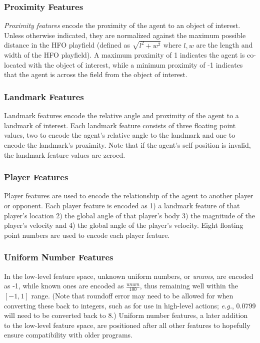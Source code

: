 \documentclass[12pt]{article}
\begin{document}
\subsubsection{Proximity Features}
\textit{Proximity features} encode the proximity of the agent to an
object of interest. Unless otherwise indicated, they are normalized
against the maximum possible distance in the HFO playfield (defined as
$\sqrt{l^2 + w^2}$ where $l,w$ are the length and width of the HFO
playfield). A maximum proximity of 1 indicates the agent is co-located
with the object of interest, while a minimum proximity of -1 indicates
that the agent is across the field from the object of interest.

\subsubsection{Landmark Features}
Landmark features encode the relative angle and proximity of the agent
to a landmark of interest. Each landmark feature consists of three
floating point values, two to encode the agent's relative angle to the
landmark and one to encode the landmark's proximity. Note that if the
agent's self position is invalid, the landmark feature values are
zeroed.

\subsubsection{Player Features}
Player features are used to encode the relationship of the agent to
another player or opponent. Each player feature is encoded as 1) a
landmark feature of that player's location 2) the global angle of that
player's body 3) the magnitude of the player's velocity and 4) the
global angle of the player's velocity. Eight floating point numbers
are used to encode each player feature.

\subsubsection{Uniform Number Features}
In the low-level feature space, unknown uniform numbers, or \textit{unums},
are encoded as -1, while known ones are encoded as $\frac{unum}{100}$, thus
remaining well within the $[-1, 1]$ range. (Note that roundoff error may need
to be allowed for when converting these back to integers, such as for use in
high-level actions; \textit{e.g.}, 0.0799 will need to be converted back to 8.)
Uniform number features, a later addition to the low-level feature space,
are positioned after all other features to hopefully ensure compatibility
with older programs.
\end{document}
